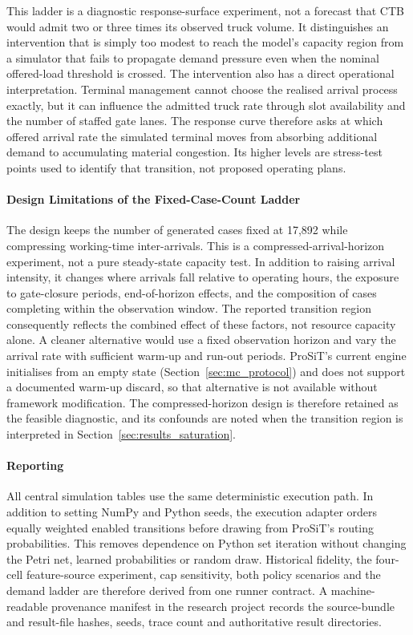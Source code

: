 This ladder is a diagnostic response-surface experiment, not a forecast that
CTB would admit two or three times its observed truck volume. It distinguishes
an intervention that is simply too modest to reach the model's capacity region
from a simulator that fails to propagate demand pressure even when the
nominal offered-load threshold is crossed. The intervention also has a direct
operational interpretation. Terminal management cannot choose the realised
arrival process exactly, but it can influence the admitted truck rate through
slot availability and the number of staffed gate lanes. The response curve
therefore asks at which offered arrival rate the simulated terminal moves from
absorbing additional demand to accumulating material congestion. Its higher
levels are stress-test points used to identify that transition, not proposed
operating plans.

\paragraph{Design Limitations of the Fixed-Case-Count Ladder}

The design keeps the number of generated cases fixed at 17,892 while
compressing working-time inter-arrivals.  This is a compressed-arrival-horizon
experiment, not a pure steady-state capacity test.  In addition to raising
arrival intensity, it changes where arrivals fall relative to operating hours,
the exposure to gate-closure periods, end-of-horizon effects, and the
composition of cases completing within the observation window.  The reported
transition region consequently reflects the combined effect of these factors,
not resource capacity alone.  A cleaner alternative would use a fixed
observation horizon and vary the arrival rate with sufficient warm-up and
run-out periods.  ProSiT's current engine initialises from an empty state
(Section~\ref{sec:mc_protocol}) and does not support a documented
warm-up discard, so that alternative is not available without framework
modification.  The compressed-horizon design is therefore retained as the
feasible diagnostic, and its confounds are noted when the transition region is
interpreted in Section~\ref{sec:results_saturation}.

\paragraph{Reporting}

All central simulation tables use the same deterministic execution path. In
addition to setting NumPy and Python seeds, the execution adapter orders
equally weighted enabled transitions before drawing
from ProSiT's routing probabilities. This removes dependence on Python set
iteration without changing the Petri net, learned probabilities or random
draw. Historical fidelity, the four-cell feature-source experiment, cap sensitivity,
both policy scenarios and the demand ladder are therefore
derived from one runner contract. A machine-readable provenance manifest in
the research project records the source-bundle and result-file hashes, seeds,
trace count and authoritative result directories.


